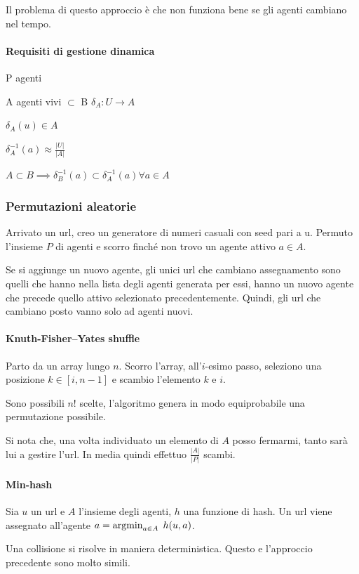 Il problema di questo approccio è che non funziona bene se gli agenti cambiano nel tempo.

\paragraph{Requisiti di gestione dinamica}

P agenti

A agenti vivi $\subset$ B 
$\delta_A : U \rightarrow A$

$\delta_A(u) \in A$

$\delta_A^{-1}(a) \approx \frac{|U|}{|A|}$

$A \subset B \implies \delta_B^{-1}(a) \subset \delta_A^{-1}(a) \forall a \in A$

\subsubsection{Permutazioni aleatorie}
Arrivato un url, creo un generatore di numeri casuali con seed pari a u. 
Permuto l'insieme $P$ di agenti e scorro finché non trovo un agente attivo $a \in A$.

Se si aggiunge un nuovo agente, gli unici url che cambiano assegnamento 
sono quelli che hanno nella lista degli agenti generata per essi, hanno un  nuovo agente che precede quello attivo selezionato precedentemente.
Quindi, gli url che cambiano posto vanno solo ad agenti nuovi.

\paragraph{Knuth-Fisher–Yates shuffle}
Parto da un array lungo $n$.
Scorro l'array, all'$i$-esimo passo, seleziono una posizione $k \in [i, n-1]$ e 
scambio l'elemento $k$ e $i$.

Sono possibili $n!$ scelte, l'algoritmo genera in modo equiprobabile una permutazione possibile.

Si nota che, una volta individuato un elemento di $A$ posso fermarmi, tanto sarà
lui a gestire l'url. 
In media quindi effettuo $\frac{|A|}{|P|}$ scambi.

\paragraph{Min-hash}
Sia $u$ un url e $A$ l'insieme degli agenti, $h$ una funzione di hash. 
Un url viene assegnato all'agente $a = \argmin_{a\in A}\;h(u,a)$.

Una collisione si risolve in maniera deterministica. Questo e l'approccio
precedente sono molto simili.

